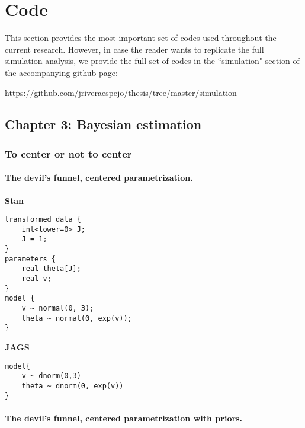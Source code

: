 \chapter{Code} \label{appC:additional}

This section provides the most important set of codes used throughout the current research. However, in case the reader wants to replicate the full simulation analysis, we provide the full set of codes in the ``simulation" section of the accompanying github page:

\noindent \url{https://github.com/jriveraespejo/thesis/tree/master/simulation} \\


\section{Chapter 3: Bayesian estimation} \label{appC1:chapter3}

\subsection{To center or not to center} \label{appC1_1:noncenter}

\subsubsection{The devil's funnel, centered parametrization.} 

\noindent \textbf{Stan}
%
\begin{lstlisting}
transformed data {
	int<lower=0> J;
	J = 1;
}
parameters {
	real theta[J];
	real v;
}
model {
	v ~ normal(0, 3);
	theta ~ normal(0, exp(v));
}
\end{lstlisting}


\noindent \textbf{JAGS}
%
\begin{lstlisting}
model{
	v ~ dnorm(0,3)
	theta ~ dnorm(0, exp(v))
}
\end{lstlisting}




\subsubsection{The devil's funnel, centered parametrization with priors.} 

